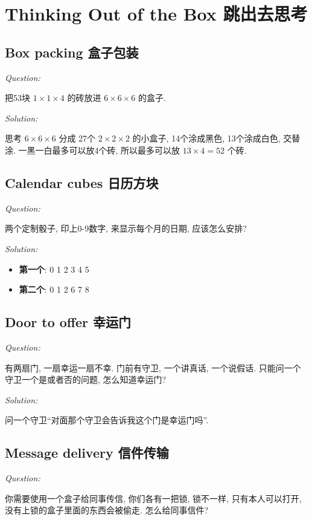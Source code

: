 \documentclass[12pt]{book}
\begin{document}
\section{Thinking Out of the Box 跳出去思考}
\subsection{Box packing 盒子包装}
\noindent \textit{Question:}

把53块 $1\times 1\times 4$ 的砖放进 $6\times 6 \times 6$ 的盒子.

\noindent \textit{Solution:} 

思考 $6\times 6 \times 6$ 分成 27个 $2\times 2 \times 2$ 的小盒子, 14个涂成黑色, 13个涂成白色, 交替涂. 一黑一白最多可以放4个砖, 所以最多可以放 $13\times 4 =52$ 个砖.

\subsection{Calendar cubes 日历方块}
\noindent \textit{Question:}

两个定制骰子, 印上0-9数字, 来显示每个月的日期, 应该怎么安排?

\noindent \textit{Solution:} 

\begin{itemize}
  \item \textbf{第一个}: 0 1 2 3 4 5
  \item \textbf{第二个}: 0 1 2 6 7 8
\end{itemize}

\subsection{Door to offer 幸运门}
\noindent \textit{Question:}

有两扇门, 一扇幸运一扇不幸. 门前有守卫, 一个讲真话, 一个说假话. 只能问一个守卫一个是或者否的问题, 怎么知道幸运门?

\noindent \textit{Solution:} 

问一个守卫“对面那个守卫会告诉我这个门是幸运门吗”.

\subsection{Message delivery 信件传输}
\noindent \textit{Question:}

你需要使用一个盒子给同事传信, 你们各有一把锁, 锁不一样, 只有本人可以打开, 没有上锁的盒子里面的东西会被偷走. 怎么给同事信件?
\end{document}
